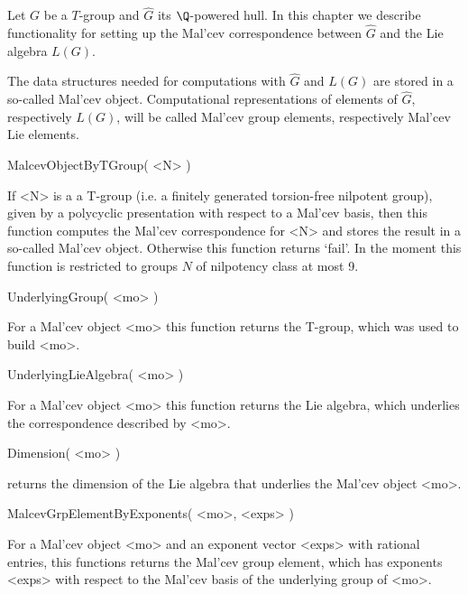 


Let $G$ be a $T$-group
and $\hat{G}$ its $\Q$-powered hull.
In this chapter we describe functionality 
for setting up the 
Mal'cev correspondence
between $\hat{G}$ and the Lie algebra $L(G)$.

The data structures needed for computations with $\hat{G}$ and 
$L(G)$ are 
stored in a so-called Mal'cev object.
Computational representations of 
elements of $\hat{G}$, respectively $L(G)$, 
will be called Mal'cev group elements, respectively 
Mal'cev Lie elements.

\> MalcevObjectByTGroup( <N> )

If <N> is a a T-group 
(i.e. a finitely generated torsion-free nilpotent group),
given by a polycyclic presentation with respect to a Mal'cev basis,
then this function computes the Mal'cev correspondence for <N> 
and stores the result in a so-called Mal'cev object. 
Otherwise this function returns `fail'.
In the moment this function is restricted to groups $N$
of nilpotency class at most 9.

\> UnderlyingGroup( <mo> )

For a Mal'cev object <mo> this function returns the T-group,
which was used to build <mo>.

\> UnderlyingLieAlgebra( <mo> )

For a Mal'cev object <mo> this function returns the Lie algebra,
which underlies the correspondence described by <mo>.

\> Dimension( <mo> )

returns the dimension of the Lie algebra that underlies the Mal'cev object <mo>.

\> MalcevGrpElementByExponents( <mo>, <exps> )

For a Mal'cev object <mo> and an exponent vector <exps> with rational 
entries, this functions returns the Mal'cev group element, which 
has exponents <exps> with respect to the Mal'cev basis of the underlying
group of <mo>.

